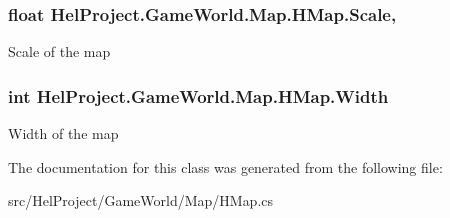 \hypertarget{class_hel_project_1_1_game_world_1_1_map_1_1_h_map_a023973ffc8b857d992378e235632021c}{}
\subsubsection[{Scale}]{\setlength{\rightskip}{0pt plus 5cm}float Hel\+Project.\+Game\+World.\+Map.\+H\+Map.\+Scale\hspace{0.3cm}{\ttfamily [get]}, {\ttfamily [set]}}\label{class_hel_project_1_1_game_world_1_1_map_1_1_h_map_a023973ffc8b857d992378e235632021c}


Scale of the map 

\hypertarget{class_hel_project_1_1_game_world_1_1_map_1_1_h_map_aeb3db69a653089c32c2b61c7612bd106}{}
\subsubsection[{Width}]{\setlength{\rightskip}{0pt plus 5cm}int Hel\+Project.\+Game\+World.\+Map.\+H\+Map.\+Width\hspace{0.3cm}{\ttfamily [get]}}\label{class_hel_project_1_1_game_world_1_1_map_1_1_h_map_aeb3db69a653089c32c2b61c7612bd106}


Width of the map 



The documentation for this class was generated from the following file\+:\begin{DoxyCompactItemize}
\item 
src/\+Hel\+Project/\+Game\+World/\+Map/H\+Map.\+cs\end{DoxyCompactItemize}
